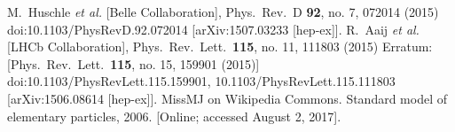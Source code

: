 \documentclass[12pt]{article}
\begin{document}
\begin{thebibliography}{9}
  M.~Huschle {\it et al.} [Belle Collaboration],
  Phys.\ Rev.\ D {\bf 92}, no. 7, 072014 (2015)
  doi:10.1103/PhysRevD.92.072014
  [arXiv:1507.03233 [hep-ex]].
  R.~Aaij {\it et al.} [LHCb Collaboration],
  Phys.\ Rev.\ Lett.\  {\bf 115}, no. 11, 111803 (2015)
  Erratum: [Phys.\ Rev.\ Lett.\  {\bf 115}, no. 15, 159901 (2015)]
  doi:10.1103/PhysRevLett.115.159901, 10.1103/PhysRevLett.115.111803
  [arXiv:1506.08614 [hep-ex]].
  MissMJ on Wikipedia Commons. Standard model of elementary particles, 2006. [Online;   accessed August 2, 2017].
\end{thebibliography}
\newpage
\end{document}
